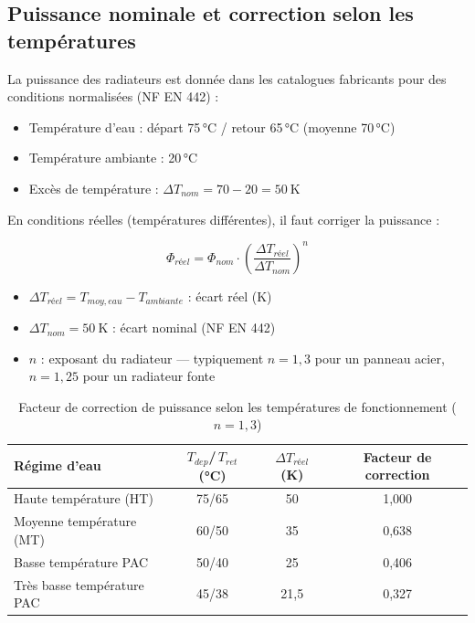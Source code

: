 \subsection{Puissance nominale et correction selon les températures}

La puissance des radiateurs est donnée dans les catalogues fabricants pour des conditions normalisées (NF EN 442) :
\begin{itemize}
  \item Température d'eau : départ 75\,°C / retour 65\,°C (moyenne 70\,°C)
  \item Température ambiante : 20\,°C
  \item Excès de température : $\Delta T_{nom} = 70 - 20 = \SI{50}{\kelvin}$
\end{itemize}

En conditions réelles (températures différentes), il faut corriger la puissance :

\begin{equation}
  \Phi_{réel} = \Phi_{nom} \cdot \left(\frac{\Delta T_{réel}}{\Delta T_{nom}}\right)^n
  \label{eq:radiateur_correction}
\end{equation}
\begin{itemize}
  \item $\Delta T_{réel} = T_{moy,eau} - T_{ambiante}$ : écart réel (\si{\kelvin})
  \item $\Delta T_{nom} = \SI{50}{\kelvin}$ : écart nominal (NF EN 442)
  \item $n$ : exposant du radiateur — typiquement $n = 1{,}3$ pour un panneau acier, $n = 1{,}25$ pour un radiateur fonte
\end{itemize}

\begin{table}[H]
  \centering
  \caption{Facteur de correction de puissance selon les températures de fonctionnement ($n = 1{,}3$)}
  \begin{tabular}{lccc}
    \toprule
    Régime d'eau & $T_{dep}$/\,$T_{ret}$ (°C) & $\Delta T_{réel}$ (K) & Facteur de correction \\
    \midrule
    Haute température (HT) & 75/65 & 50 & 1,000 \\
    Moyenne température (MT) & 60/50 & 35 & 0,638 \\
    Basse température PAC & 50/40 & 25 & 0,406 \\
    Très basse température PAC & 45/38 & 21,5 & 0,327 \\
    \bottomrule
  \end{tabular}
\end{table}

